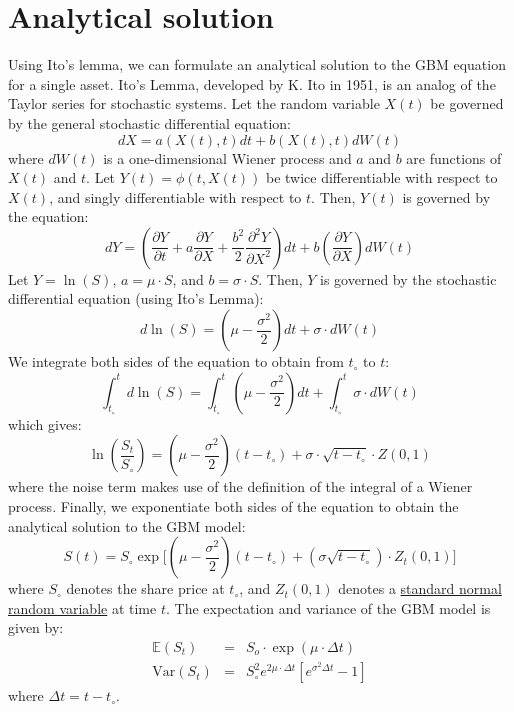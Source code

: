 \documentclass[11pt]{article}
\theoremstyle{definition}
\begin{document}
\section*{Analytical solution}
Using Ito's lemma, we can formulate an analytical solution to the GBM equation for a single asset.
Ito's Lemma, developed by K. Ito in 1951, is an analog of the Taylor series for stochastic systems.
Let the random variable $X(t)$ be governed by the general stochastic differential equation:
\begin{equation*}
dX = a\left(X(t),t\right)dt + b\left(X(t),t\right)dW(t)
\end{equation*}
where $dW(t)$ is a one-dimensional Wiener process and $a$ and $b$ are functions of $X(t)$ and $t$. 
Let $Y(t) = \phi\left(t,X(t)\right)$ be twice differentiable with respect to $X(t)$, 
and singly differentiable with respect to $t$. Then, $Y(t)$ is governed by the equation:
\begin{equation*}
dY = \left(\frac{\partial{Y}}{\partial{t}}+a\frac{\partial{Y}}{\partial{X}}+\frac{b^{2}}{2}\frac{\partial^{2}{Y}}{\partial{X}^{2}}\right)dt+b\left(\frac{\partial{Y}}{\partial{X}}\right)dW(t)
\end{equation*}
Let $Y = \ln(S)$, $a = \mu\cdot{S}$, and $b = \sigma\cdot{S}$. 
Then, $Y$ is governed by the stochastic differential equation (using Ito's Lemma):
\begin{equation*}
d\ln(S) = \left(\mu - \frac{\sigma^{2}}{2}\right)dt + \sigma\cdot{dW(t)}
\end{equation*}
We integrate both sides of the equation to obtain from $t_{\circ}$ to $t$:
\begin{equation*}
\int_{t_{\circ}}^{t}d\ln(S) = \int_{t_{\circ}}^{t}\left(\mu - \frac{\sigma^{2}}{2}\right)dt + \int_{t_{\circ}}^{t}\sigma\cdot{dW(t)}
\end{equation*}
which gives:
\begin{equation*}
\ln\left(\frac{S_{t}}{S_{\circ}}\right) = \left(\mu - \frac{\sigma^{2}}{2}\right)\left(t - t_{\circ}\right) + \sigma\cdot\sqrt{t-t_{\circ}}\cdot{Z(0,1)}
\end{equation*}
where the noise term makes use of the definition of the integral of a Wiener process.
Finally, we exponentiate both sides of the equation to obtain the analytical solution to the GBM model:
\begin{equation}\label{eqn:analytical-soln-GBM}
S(t) = S_{\circ}\exp\Biggl[\left(\mu-\frac{\sigma^{2}}{2}\right)\left(t - t_{\circ}\right) + (\sigma\sqrt{t-t_{\circ}})\cdot{Z_{t}(0,1)}\Biggr]
\end{equation}
where $S_{\circ}$ denotes the share price at $t_{\circ}$, and $Z_{t}(0,1)$ denotes a 
\href{https://en.wikipedia.org/wiki/Normal_distribution#Standard_normal_distribution}{standard normal random variable} at time $t$.
The expectation and variance of the GBM model is given by:
\begin{eqnarray*}
\mathbb{E}\left(S_{t}\right) &=& S_{o}\cdot\exp\left(\mu\cdot\Delta{t}\right)\\
\text{Var}\left(S_{t}\right) &=& S_{\circ}^{2}e^{2\mu\cdot\Delta{t}}\left[e^{\sigma^{2}{\Delta{t}}} - 1\right]
\end{eqnarray*}
where $\Delta{t} = t - t_{\circ}$.
\end{document}
